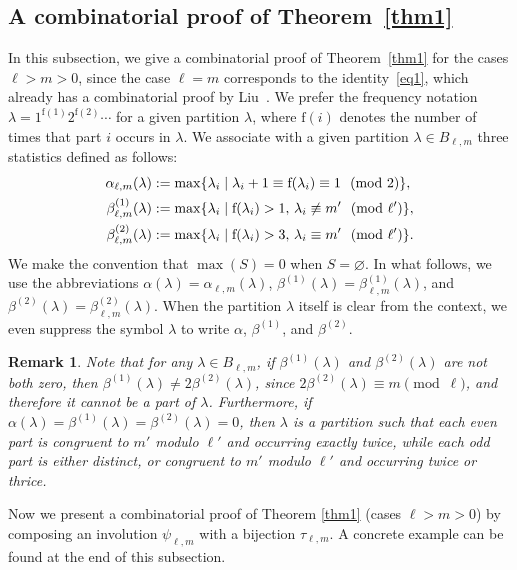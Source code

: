 \documentclass[12pt,reqno]{amsart}
\numberwithin{equation}{section}
\newtheorem{remark}[Theorem]{Remark}
\newcommand{\f}{\mathrm{f}}
\newcommand{\tpmod}[1]{\mkern 12mu(\textup{mod}\mkern 6mu #1)}
\begin{document}
\subsection{A combinatorial proof of Theorem~\ref{thm1}}
In this subsection, we give a combinatorial proof of Theorem~\ref{thm1} for the cases $\ell>m>0$, since the case $\ell=m$ corresponds to the identity~\eqref{eq1}, which already has a combinatorial proof by Liu~\cite[Theorem~1.1]{liu2025}. We prefer the frequency notation $\lambda=1^{\f(1)}2^{\f(2)}\cdots$ for a given partition $\lambda$, where $\f(i)$ denotes the number of times that part $i$ occurs in $\lambda$. We associate with a given partition $\lambda\in B_{\ell,m}$ three statistics defined as follows:
\begin{align}
	\alpha_{\ell,m}(\lambda) &:=\max\{\lambda_{i}\mid \lambda_i+1\equiv \f(\lambda_{i})\equiv 1\tpmod{2}\},\\
	\beta_{\ell,m}^{(1)}(\lambda) &:=\max\{\lambda_{i}\mid \f(\lambda_{i})>1,\,\lambda_{i}\not\equiv m'\tpmod{\ell'}\},\\
	\beta_{\ell,m}^{(2)}(\lambda) &:=\max\{\lambda_{i}\mid \f(\lambda_{i})>3,\,\lambda_{i}\equiv m'\tpmod{\ell'}\}.
\end{align}
We make the convention that $\max(S)=0$ when $S=\varnothing$. In what follows, we use the abbreviations $\alpha(\lambda)=\alpha_{\ell,m}(\lambda)$, $\beta^{(1)}(\lambda)=\beta_{\ell,m}^{(1)}(\lambda)$, and $\beta^{(2)}(\lambda)=\beta_{\ell,m}^{(2)}(\lambda)$. When the partition $\lambda$ itself is clear from the context, we even suppress the symbol $\lambda$ to write $\alpha$, $\beta^{(1)}$, and $\beta^{(2)}$.
\begin{remark}\label{ab0}
	Note that for any $\lambda\in B_{\ell,m}$, if $\beta^{(1)}(\lambda)$ and $\beta^{(2)}(\lambda)$ are not both zero, then $\beta^{(1)}(\lambda)\not=2\beta^{(2)}(\lambda)$, since $2\beta^{(2)}(\lambda)\equiv m\pmod{\ell}$, and therefore it cannot be a part of $\lambda$. Furthermore, if $\alpha(\lambda)=\beta^{(1)}(\lambda)=\beta^{(2)}(\lambda)=0$, then $\lambda$ is a partition such that each even part is congruent to $m'$ modulo $\ell'$ and occurring exactly twice, while each odd part is either distinct, or congruent to $m'$ modulo $\ell'$ and occurring twice or thrice.
\end{remark}

Now we present a combinatorial proof of Theorem \ref{thm1} (cases $\ell>m>0$) by composing an involution $\psi_{\ell,m}$ with a bijection $\tau_{\ell,m}$. A concrete example can be found at the end of this subsection.
\end{document}
